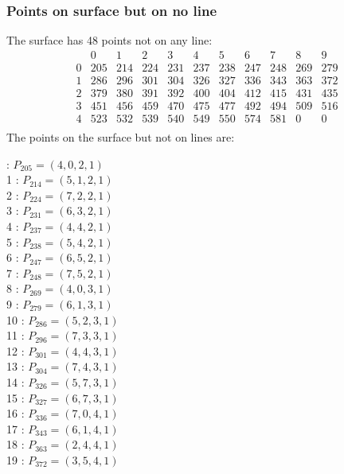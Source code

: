 \documentclass{article}
\begin{document}
{\subsubsection*{Points on surface but on no line}
The surface has 48 points not on any line:\\
$$
\begin{array}{r|*{10}{r}}
 & 0 & 1 & 2 & 3 & 4 & 5 & 6 & 7 & 8 & 9\\
\hline
0 & 205 & 214 & 224 & 231 & 237 & 238 & 247 & 248 & 269 & 279\\
1 & 286 & 296 & 301 & 304 & 326 & 327 & 336 & 343 & 363 & 372\\
2 & 379 & 380 & 391 & 392 & 400 & 404 & 412 & 415 & 431 & 435\\
3 & 451 & 456 & 459 & 470 & 475 & 477 & 492 & 494 & 509 & 516\\
4 & 523 & 532 & 539 & 540 & 549 & 550 & 574 & 581 & 0 & 0\\
\end{array}
$$
The points on the surface but not on lines are:\\
\begin{multicols}{2}
 : $P_{205}=( 4, 0, 2, 1 )$\\
1 : $P_{214}=( 5, 1, 2, 1 )$\\
2 : $P_{224}=( 7, 2, 2, 1 )$\\
3 : $P_{231}=( 6, 3, 2, 1 )$\\
4 : $P_{237}=( 4, 4, 2, 1 )$\\
5 : $P_{238}=( 5, 4, 2, 1 )$\\
6 : $P_{247}=( 6, 5, 2, 1 )$\\
7 : $P_{248}=( 7, 5, 2, 1 )$\\
8 : $P_{269}=( 4, 0, 3, 1 )$\\
9 : $P_{279}=( 6, 1, 3, 1 )$\\
10 : $P_{286}=( 5, 2, 3, 1 )$\\
11 : $P_{296}=( 7, 3, 3, 1 )$\\
12 : $P_{301}=( 4, 4, 3, 1 )$\\
13 : $P_{304}=( 7, 4, 3, 1 )$\\
14 : $P_{326}=( 5, 7, 3, 1 )$\\
15 : $P_{327}=( 6, 7, 3, 1 )$\\
16 : $P_{336}=( 7, 0, 4, 1 )$\\
17 : $P_{343}=( 6, 1, 4, 1 )$\\
18 : $P_{363}=( 2, 4, 4, 1 )$\\
19 : $P_{372}=( 3, 5, 4, 1 )$\\

\end{multicols}}
\end{document}

